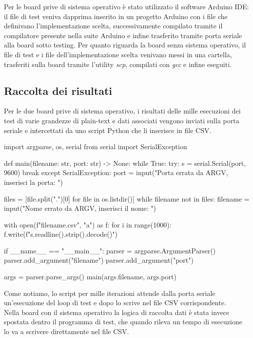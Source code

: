 \documentclass[12pt,a4paper,italian]{report}
\begin{document}
Per le board prive di sistema operativo è stato utilizzato il software Arduino IDE: il file di test veniva dapprima inserito in un progetto Arduino con i file che definivano l'implementazione scelta, successivamente compilato tramite il compilatore presente nella suite Arduino e infine trasferito tramite porta seriale alla board sotto testing. Per quanto riguarda la board senza sistema operativo, il file di test e i file dell'implementazione scelta venivano messi in una cartella, trasferiti sulla board tramite l'utility \textit{scp}, compilati con \textit{gcc} e infine eseguiti.

\subsection{Raccolta dei risultati}

Per le due board prive di sistema operativo, i risultati delle mille esecuzioni dei test di varie grandezze di plain-text e dati associati vengono inviati sulla porta seriale e intercettati da uno script Python che li inserisce in file CSV.

\begin{python}
import argparse, os, serial
from serial import SerialException


def main(filename: str, port: str) -> None:
  while True:
    try:
      s = serial.Serial(port, 9600)
        break
      except SerialException:
        port = input("Porta errata da ARGV, inserisci la porta: ")

  files = [file.split(".")[0] for file in os.listdir()]
  while filename not in files:
    filename = input("Nome errato da ARGV, inserisci il nome: ")

  with open(f"{filename}.csv", "a") as f:
    for i in range(1000):
      f.write(f"{s.readline().strip().decode()}\n")


if __name__ == "__main__":
  parser = argparse.ArgumentParser()
  parser.add_argument("filename")
  parser.add_argument("port")

  args = parser.parse_args()
  main(args.filename, args.port)
\end{python}

\noindent Come notiamo, lo script per mille iterazioni attende dalla porta seriale un'esecuzione del loop di test e dopo lo scrive nel file CSV corrispondente. \\

\noindent Nella board con il sistema operativo la logica di raccolta dati è stata invece spostata dentro il programma di test, che quando rileva un tempo di esecuzione lo va a scrivere direttamente nel file CSV.
\end{document}
